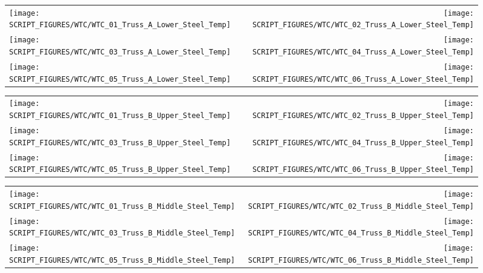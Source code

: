 \begin{figure}[p]
\begin{tabular*}{\textwidth}{l@{\extracolsep{\fill}}r}
\texttt{[image: SCRIPT\_FIGURES/WTC/WTC\_01\_Truss\_A\_Lower\_Steel\_Temp]} &
\texttt{[image: SCRIPT\_FIGURES/WTC/WTC\_02\_Truss\_A\_Lower\_Steel\_Temp]} \\
\texttt{[image: SCRIPT\_FIGURES/WTC/WTC\_03\_Truss\_A\_Lower\_Steel\_Temp]} &
\texttt{[image: SCRIPT\_FIGURES/WTC/WTC\_04\_Truss\_A\_Lower\_Steel\_Temp]} \\
\texttt{[image: SCRIPT\_FIGURES/WTC/WTC\_05\_Truss\_A\_Lower\_Steel\_Temp]} &
\texttt{[image: SCRIPT\_FIGURES/WTC/WTC\_06\_Truss\_A\_Lower\_Steel\_Temp]}
\end{tabular*}
\label{NIST_WTC_Truss_A_Lower_Steel_Temp}
\end{figure}

\begin{figure}[p]
\begin{tabular*}{\textwidth}{l@{\extracolsep{\fill}}r}
\texttt{[image: SCRIPT\_FIGURES/WTC/WTC\_01\_Truss\_B\_Upper\_Steel\_Temp]} &
\texttt{[image: SCRIPT\_FIGURES/WTC/WTC\_02\_Truss\_B\_Upper\_Steel\_Temp]} \\
\texttt{[image: SCRIPT\_FIGURES/WTC/WTC\_03\_Truss\_B\_Upper\_Steel\_Temp]} &
\texttt{[image: SCRIPT\_FIGURES/WTC/WTC\_04\_Truss\_B\_Upper\_Steel\_Temp]} \\
\texttt{[image: SCRIPT\_FIGURES/WTC/WTC\_05\_Truss\_B\_Upper\_Steel\_Temp]} &
\texttt{[image: SCRIPT\_FIGURES/WTC/WTC\_06\_Truss\_B\_Upper\_Steel\_Temp]}
\end{tabular*}
\label{NIST_WTC_Truss_B_Upper_Steel_Temp}
\end{figure}

\begin{figure}[p]
\begin{tabular*}{\textwidth}{l@{\extracolsep{\fill}}r}
\texttt{[image: SCRIPT\_FIGURES/WTC/WTC\_01\_Truss\_B\_Middle\_Steel\_Temp]} &
\texttt{[image: SCRIPT\_FIGURES/WTC/WTC\_02\_Truss\_B\_Middle\_Steel\_Temp]} \\
\texttt{[image: SCRIPT\_FIGURES/WTC/WTC\_03\_Truss\_B\_Middle\_Steel\_Temp]} &
\texttt{[image: SCRIPT\_FIGURES/WTC/WTC\_04\_Truss\_B\_Middle\_Steel\_Temp]} \\
\texttt{[image: SCRIPT\_FIGURES/WTC/WTC\_05\_Truss\_B\_Middle\_Steel\_Temp]} &
\texttt{[image: SCRIPT\_FIGURES/WTC/WTC\_06\_Truss\_B\_Middle\_Steel\_Temp]}
\end{tabular*}
\label{NIST_WTC_Truss_B_Middle_Steel_Temp}
\end{figure}

